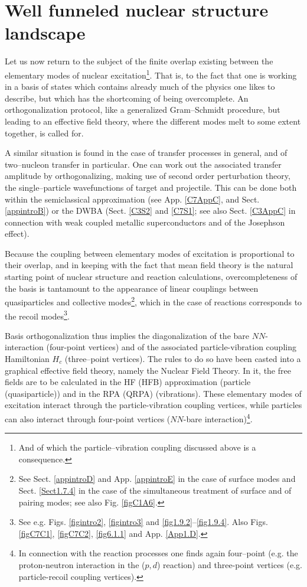 \section{Well funneled nuclear structure landscape}\label{C1S4}
Let us now return to the subject of the finite overlap existing between the elementary modes of nuclear excitation\footnote{And of which the particle--vibration coupling discussed above is a consequence.}. That is, to the fact that one is working in a basis of states which contains already much of the physics one likes to describe, but which has the shortcoming of being overcomplete. An orthogonalization protocol, like a generalized Gram--Schmidt procedure, but leading to an effective field theory, where the different modes melt to some extent together, is called for.

A similar situation is found in the case of transfer processes in general, and of two--nucleon transfer in particular. One can work out the associated transfer amplitude by orthogonalizing, making use of second order perturbation theory, the single--particle wavefunctions of target and projectile. This can be done both within the semiclassical approximation (see App. \ref{C7AppC}, and Sect. \ref{appintroB}) or the  DWBA (Sect. \ref{C3S2} and \ref{C7S1}; see also Sect. \ref{C3AppC} in connection with weak coupled metallic superconductors and of the Josephson effect). 

Because the coupling between elementary modes of excitation is proportional to their overlap, and in keeping with the fact that mean field theory is the natural starting point of nuclear structure and reaction calculations, overcompleteness of the basis is tantamount to the appearance of linear couplings between quasiparticles and collective modes\footnote{See Sect. \ref{appintroD} and App. \ref{appintroE} in the case of surface modes and Sect. \ref{Sect1.7.4} in the case of the simultaneous treatment of surface and of pairing modes; see also Fig. \ref{figC1A6}.}, which in the case of reactions corresponds to the recoil modes\footnote{See e.g. Figs. \ref{figintro2}, \ref{figintro3} and \ref{fig1.9.2}--\ref{fig1.9.4}.  Also Figs.  \ref{figC7C1}, \ref{figC7C2}, \ref{fig6.1.1} and  App. \ref{App1.D}.}.


Basis orthogonalization thus implies the diagonalization of the bare $NN$-interaction (four-point vertices) and of the  associated particle-vibration coupling Hamiltonian $H_c$ (three--point vertices). The rules to do so have been casted into a graphical effective field theory, namely the Nuclear Field Theory. In it, the free fields are to be calculated in the HF (HFB) approximation (particle (quasiparticle)) and in the RPA (QRPA) (vibrations). These elementary modes of excitation interact through the particle-vibration coupling vertices, while particles can also interact through four-point vertices ($NN$-bare interaction)\footnote{In connection with the reaction processes one finds again four--point  (e.g. the proton-neutron interaction in the ($p,d$) reaction) and three-point vertices (e.g. particle-recoil coupling vertices).}.


